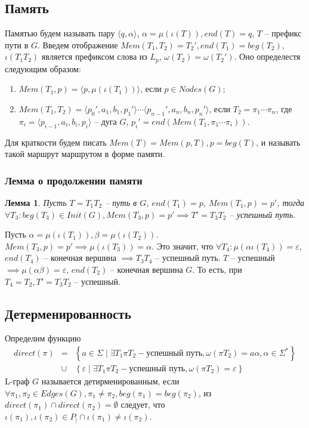 \documentclass{article}
\newtheorem{lemma}[theorem]{Лемма}
\newenvironment{proof}[1][Доказательство]{\begin{trivlist}
\item[\hskip \labelsep {\bfseries #1}]}{\end{trivlist}}
\newcommand{\qed}{\nobreak \ifvmode \relax \else
      \ifdim\lastskip<1.5em \hskip-\lastskip
      \hskip1.5em plus0em minus0.5em \fi \nobreak
      \vrule height0.75em width0.5em depth0.25em\fi}
\begin{document}
\subsection{Память}
Памятью будем называть пару $\langle q, \alpha \rangle$, $\alpha=\mu(\iota(T)), end(T)=q$, $T$ --  префикс пути в $G$. 
Введем отображение $Mem(T_1,T_2) = T_2', end(T_1) = beg(T_2)$, $\iota(T_1 T_2)$ является префиксом слова из $L_p$, $\omega(T_2) = \omega(T_2')$.
Оно определестя следующим образом:
\begin{enumerate}
    \item $Mem(T_1, p) = \langle p, \mu(\iota(T_1)) \rangle$, если $p \in Nodes(G)$;
    \item {
        $Mem(T_1, T_2) = \langle p_0', a_1, b_1, p_1' \rangle \cdots \langle p_{n-1}', a_n, b_n, p_n' \rangle$, если $T_2 =\pi_1 \cdots \pi_n$, 
        где $\pi_i = \langle p_{i-1}, a_i, b_i, p_i \rangle$ -- дуга $G$, $p_i' = end(Mem(T_1, \pi_1 \cdots \pi_i))$.
    }
\end{enumerate}

Для краткости будем писать $Mem(T) = Mem(p, T), p = beg(T)$, и называть такой маршрут маршрутом в форме памяти. 

\subsubsection*{Лемма о продолжении памяти}
\begin{lemma}
    \label{mem_continue_lemma}
    Пусть $T=T_1 T_2$ -- путь в $G$, $end(T_1) = p$, $Mem(T_1, p) = p'$, тогда $\forall T_3 : beg(T_3) \in Init(G), Mem(T_3, p) = p' \implies T' = T_3 T_2$ -- успешный путь. 
\end{lemma}
\begin{proof}
    Пусть $\alpha = \mu(\iota(T_1)), \beta = \mu(\iota(T_2))$.
    $Mem(T_3, p) = p' \implies \mu(\iota(T_3)) = \alpha$.
    Это значит, что $\forall T_4 : \mu(\alpha \iota(T_4)) = \varepsilon$, $end(T_4)$ -- конечная вершина  $\implies T_3 T_4$ -- успешный путь.
    $T$ -- успешный $\implies \mu(\alpha \beta) = \varepsilon$, $end(T_2)$ -- конечная вершина $G$. 
    То есть, при $T_4 = T_2, T' = T_3 T_2$ -- успешный. \qed

    
\end{proof}


\subsection{Детерменированность}
Определим функцию \begin{eqnarray*}
    direct(\pi) & = & \left\{ a \in \Sigma \mid \exists T_1 \pi T_2 - \text{успешный путь}, \omega(\pi T_2) = a \alpha, \alpha \in \Sigma^* \right\} \\
    & \cup & \left\{ \varepsilon \mid \exists T_1 \pi T_2 - \text{успешный путь}, \omega(\pi T_2) = \varepsilon \right\}
\end{eqnarray*}
L-граф $G$ называется детирменированным, если
$\forall \pi_1, \pi_2 \in Edges(G), \pi_1 \neq \pi_2, beg(\pi_1) = beg(\pi_2)$, 
из $direct(\pi_1) \cap direct(\pi_2) = \emptyset$ следует, что 
$\iota(\pi_1), \iota(\pi_2) \in P_] \cap \iota(\pi_1) \neq \iota(\pi_2)$. 
\end{document}
